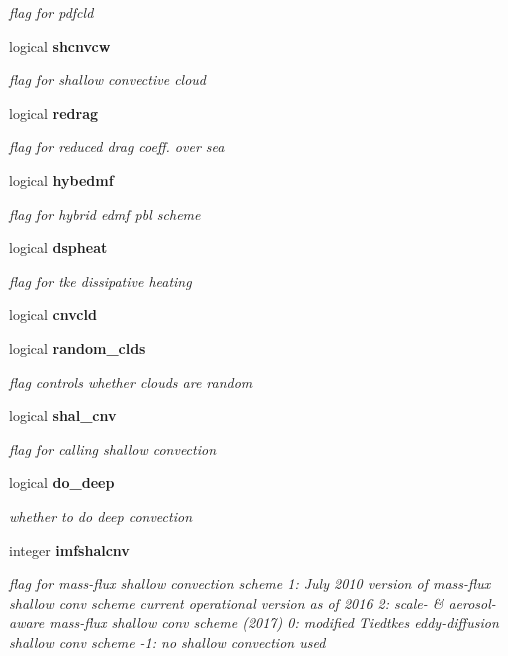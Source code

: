\begin{DoxyCompactItemize}
\begin{DoxyCompactList}\small\item\em flag for pdfcld \end{DoxyCompactList}\item 
logical \textbf{ shcnvcw}
\begin{DoxyCompactList}\small\item\em flag for shallow convective cloud \end{DoxyCompactList}\item 
logical \textbf{ redrag}
\begin{DoxyCompactList}\small\item\em flag for reduced drag coeff. over sea \end{DoxyCompactList}\item 
logical \textbf{ hybedmf}
\begin{DoxyCompactList}\small\item\em flag for hybrid edmf pbl scheme \end{DoxyCompactList}\item 
logical \textbf{ dspheat}
\begin{DoxyCompactList}\small\item\em flag for tke dissipative heating \end{DoxyCompactList}\item 
logical \textbf{ cnvcld}
\item 
logical \textbf{ random\+\_\+clds}
\begin{DoxyCompactList}\small\item\em flag controls whether clouds are random \end{DoxyCompactList}\item 
logical \textbf{ shal\+\_\+cnv}
\begin{DoxyCompactList}\small\item\em flag for calling shallow convection \end{DoxyCompactList}\item 
logical \textbf{ do\+\_\+deep}
\begin{DoxyCompactList}\small\item\em whether to do deep convection \end{DoxyCompactList}\item 
integer \textbf{ imfshalcnv}
\begin{DoxyCompactList}\small\item\em flag for mass-\/flux shallow convection scheme 1\+: July 2010 version of mass-\/flux shallow conv scheme current operational version as of 2016 2\+: scale-\/ \& aerosol-\/aware mass-\/flux shallow conv scheme (2017) 0\+: modified Tiedtke\textquotesingle{}s eddy-\/diffusion shallow conv scheme -\/1\+: no shallow convection used \end{DoxyCompactList}\item 

\end{DoxyCompactItemize}
